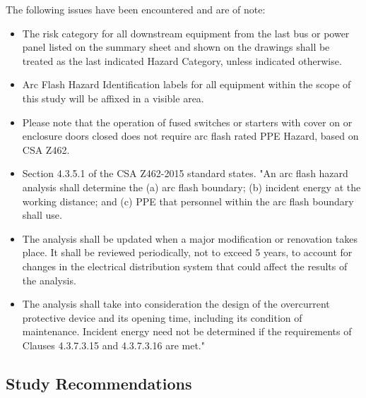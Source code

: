The following issues have been encountered and are of note:

\begin{itemize} 
\item The risk category for all downstream equipment from the last bus or power panel listed on the summary sheet and shown on the drawings shall be treated as the last indicated Hazard Category, unless indicated otherwise.

\item Arc Flash Hazard Identification labels for all equipment within the scope of this study will be affixed in a visible area.

\item Please note that the operation of fused switches or starters with cover on or enclosure doors closed does not require arc flash rated PPE Hazard, based on CSA Z462.

\item Section 4.3.5.1 of the CSA Z462-2015 standard states. "An arc flash hazard analysis shall determine the (a) arc flash boundary; (b) incident energy at the working distance; and (c) PPE that personnel within the arc flash boundary shall use.\cite{CSA}

\item The analysis shall be updated when a major modification or renovation takes place. It shall be reviewed periodically, not to exceed 5 years, to account for changes in the electrical distribution system that could affect the results of the analysis.\cite{CSA}


\item The analysis shall take into consideration the design of the overcurrent protective device and its opening time, including its condition of maintenance. Incident energy need not be determined if the requirements of Clauses 4.3.7.3.15 and 4.3.7.3.16 are met."\cite{CSA}
 

\end{itemize}
\pagebreak
\subsection{Study Recommendations}
\label{af:results:afsr}


